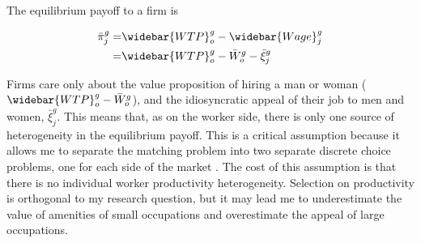 \documentclass[12pt]{article}
\begin{document}

The equilibrium payoff to a firm is

\begin{align}
  \bar{\pi}^g_j =& \widebar{WTP}^g_o - \widebar{Wage}^g_j \\ \nonumber
  =& \widebar{WTP}^g_o -  \bar{W}^g_o - \bar{\xi}^g_j
\end{align}

Firms care only about the value proposition of hiring a man or woman ($\widebar{WTP}^g_o -  \bar{W}^g_o$), and the idiosyncratic appeal of their job to men and women, $\bar{\xi}^g_j$. This means that, as on the worker side, there is only one source of heterogeneity in the equilibrium payoff. This is a critical assumption because it allows me to separate the matching problem into two separate discrete choice problems, one for each side of the market \cite{Galichon2013}. The cost of this assumption is that there is no individual worker productivity heterogeneity. Selection on productivity is orthogonal to my research question, but it may lead me to underestimate the value of amenities of small occupations and overestimate the appeal of large occupations.




\end{document}
